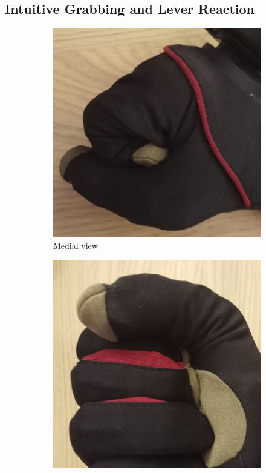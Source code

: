 \documentclass[hyperref, bachelorofscience]{cgvpub}
\begin{document}
\subsection{Intuitive Grabbing and Lever Reaction}
\begin{figure}
	\centering
	\begin{subfigure}{.45\linewidth}
		\includegraphics[width=\linewidth]{../pics/grab1}
		\caption{Medial view}
		\label{fig:grab:medial}
	\end{subfigure}
	\hfill
	\begin{subfigure}{.45\linewidth}
		\includegraphics[width=\linewidth]{../pics/grab2}

\end{subfigure}
\end{figure}
\end{document}
